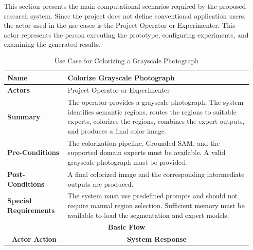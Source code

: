 \documentclass{FastFyp}
\begin{document}
This section presents the main computational scenarios required by the proposed research system. Since the project does not define conventional application users, the actor used in the use cases is the Project Operator or Experimenter. This actor represents the person executing the prototype, configuring experiments, and examining the generated results.

\begin{longtable}{|p{0.7cm}|p{2.7cm}|p{3.5cm}|p{0.8cm}|p{5.7cm}|}
\caption{Use Case for Colorizing a Grayscale Photograph}
\label{tab:uc-colorize-photograph}\\
\hline

\multicolumn{2}{|l|}{\textbf{Name}} &
\multicolumn{3}{p{10.4cm}|}{Colorize Grayscale Photograph} \\ \hline

\multicolumn{2}{|l|}{\textbf{Actors}} &
\multicolumn{3}{p{10.4cm}|}{Project Operator or Experimenter} \\ \hline

\multicolumn{2}{|l|}{\textbf{Summary}} &
\multicolumn{3}{p{10.4cm}|}{
The operator provides a grayscale photograph. The system identifies semantic regions, routes the regions to suitable experts, colorizes the regions, combines the expert outputs, and produces a final color image.
} \\ \hline

\multicolumn{2}{|l|}{\textbf{Pre-Conditions}} &
\multicolumn{3}{p{10.4cm}|}{
The colorization pipeline, Grounded SAM, and the supported domain experts must be available. A valid grayscale photograph must be provided.
} \\ \hline

\multicolumn{2}{|l|}{\textbf{Post-Conditions}} &
\multicolumn{3}{p{10.4cm}|}{
A final colorized image and the corresponding intermediate outputs are produced.
} \\ \hline

\multicolumn{2}{|l|}{\textbf{Special Requirements}} &
\multicolumn{3}{p{10.4cm}|}{
The system must use predefined prompts and should not require manual region selection. Sufficient memory must be available to load the segmentation and expert models.
} \\ \hline

\multicolumn{5}{|c|}{\textbf{Basic Flow}} \\ \hline

\multicolumn{3}{|c|}{\textbf{Actor Action}} &
\multicolumn{2}{c|}{\textbf{System Response}} \\ \hline


\end{longtable}
\end{document}
